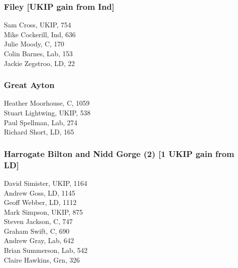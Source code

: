 \documentclass[a4paper,openany,10pt]{book}
\begin{document}
\subsubsection*{Filey \hspace*{\fill}\nolinebreak[1]%
\enspace\hspace*{\fill}
[UKIP gain from Ind]}



Sam Cross, UKIP, 754\\
Mike Cockerill, Ind, 636\\
Julie Moody, C, 170\\
Colin Barnes, Lab, 153\\
Jackie Zegstroo, LD, 22\\


\subsubsection*{Great Ayton}



Heather Moorhouse, C, 1059\\
Stuart Lightwing, UKIP, 538\\
Paul Spellman, Lab, 274\\
Richard Short, LD, 165\\


\subsubsection*{Harrogate Bilton and Nidd Gorge (2) \hspace*{\fill}\nolinebreak[1]%
\enspace\hspace*{\fill}
[1 UKIP gain from LD]}



David Simister, UKIP, 1164\\
Andrew Goss, LD, 1145\\
Geoff Webber, LD, 1112\\
Mark Simpson, UKIP, 875\\
Steven Jackson, C, 747\\
Graham Swift, C, 690\\
Andrew Gray, Lab, 642\\
Brian Summerson, Lab, 542\\
Claire Hawkins, Grn, 326\\
\end{document}
